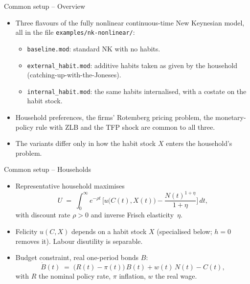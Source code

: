 \documentclass[11pt,aspectratio=169]{beamer}
\begin{document}
\begin{frame}{Common setup -- Overview}

\begin{itemize}

\item Three flavours of the fully nonlinear continuous-time New Keynesian
  model, all in the file \texttt{examples/nk-nonlinear/}:\newline

\begin{itemize}

\item \texttt{baseline.mod}: standard NK with no habits.\newline

\item \texttt{external\_habit.mod}: additive habits taken as given by
  the household (catching-up-with-the-Joneses).\newline

\item \texttt{internal\_habit.mod}: the same habits internalised, with
  a costate on the habit stock.

\end{itemize}

\item Household preferences, the firms' Rotemberg pricing problem, the
  monetary-policy rule with ZLB and the TFP shock are common to all
  three.\newline

\item The variants differ only in how the habit stock $X$ enters the
  household's problem.

\end{itemize}

\end{frame}

\begin{frame}{Common setup -- Households}

\begin{itemize}

\item Representative household maximises
  \[
  U \;=\; \int_0^\infty e^{-\rho t}\,\bigg[u\bigl(C(t),X(t)\bigr) -
  \frac{N(t)^{1+\eta}}{1+\eta}\bigg]\,dt,
  \]
  with discount rate $\rho>0$ and inverse Frisch elasticity~$\eta$.\newline

\item Felicity $u(C,X)$ depends on a habit stock $X$ (specialised
  below; $h=0$ removes it). Labour disutility is separable.\newline

\item Budget constraint, real one-period bonds $B$:
  \[
  \dot B(t) \;=\; \bigl(R(t)-\pi(t)\bigr)\,B(t) + w(t)\,N(t) - C(t),
  \]
  with $R$ the nominal policy rate, $\pi$ inflation, $w$ the real wage.

\end{itemize}

\end{frame}
\end{document}

